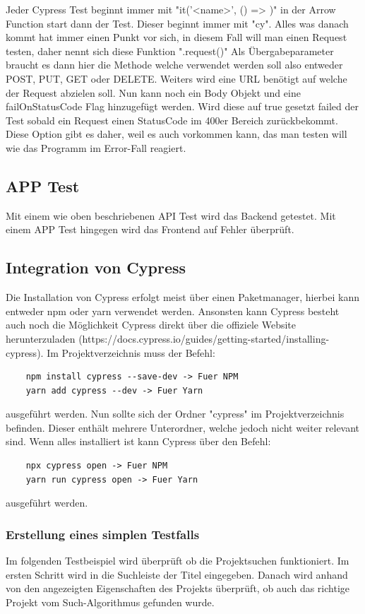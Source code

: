 Jeder Cypress Test beginnt immer mit "it('<name>', () => {})" in der Arrow Function start dann der Test. Dieser beginnt immer mit "cy". Alles was danach kommt hat immer einen Punkt vor sich, in diesem Fall will man einen Request testen, daher nennt sich diese Funktion ".request({})" Als Übergabeparameter braucht es dann hier die Methode welche verwendet werden soll also entweder POST, PUT, GET oder DELETE. Weiters wird eine URL benötigt auf welche der Request abzielen soll. Nun kann noch ein Body Objekt und eine failOnStatusCode Flag hinzugefügt werden. Wird diese auf true gesetzt failed der Test sobald ein Request einen StatusCode im 400er Bereich zurückbekommt. Diese Option gibt es daher, weil es auch vorkommen kann, das man testen will wie das Programm im Error-Fall reagiert.

\subsection{APP Test}
Mit einem wie oben beschriebenen API Test wird das Backend getestet. Mit einem APP Test hingegen wird das Frontend auf Fehler überprüft. 


\subsection{Integration von Cypress}
Die Installation von Cypress erfolgt meist über einen Paketmanager, hierbei kann entweder npm oder yarn verwendet werden. Ansonsten kann Cypress besteht auch noch die Möglichkeit Cypress direkt über die offiziele Website herunterzuladen (https://docs.cypress.io/guides/getting-started/installing-cypress).
Im Projektverzeichnis muss der Befehl:

\begin{lstlisting}
    npm install cypress --save-dev -> Fuer NPM
    yarn add cypress --dev -> Fuer Yarn
\end{lstlisting}

ausgeführt werden.
Nun sollte sich der Ordner "cypress" im Projektverzeichnis befinden. Dieser enthält mehrere Unterordner, welche jedoch nicht weiter relevant sind. Wenn alles installiert ist kann Cypress über den Befehl:

\begin{lstlisting}
    npx cypress open -> Fuer NPM
    yarn run cypress open -> Fuer Yarn
\end{lstlisting}

ausgeführt werden.

\subsubsection{Erstellung eines simplen Testfalls}
Im folgenden Testbeispiel wird überprüft ob die Projektsuchen funktioniert. Im ersten Schritt wird in die Suchleiste der Titel eingegeben. Danach wird anhand von den angezeigten Eigenschaften des Projekts überprüft, ob auch das richtige Projekt vom Such-Algorithmus gefunden wurde. 

